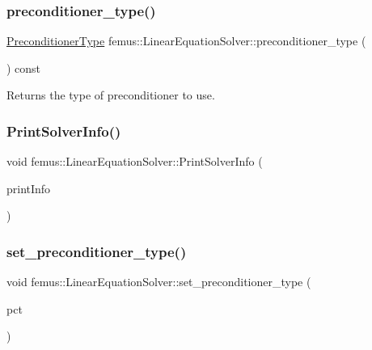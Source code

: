 \subsubsection{\texorpdfstring{preconditioner\+\_\+type()}{preconditioner\_type()}}
{\footnotesize\ttfamily \mbox{\hyperlink{_precondtype_enum_8hpp_a8b341faac6531c4543c9dc6e5e4592cf}{Preconditioner\+Type}} femus\+::\+Linear\+Equation\+Solver\+::preconditioner\+\_\+type (\begin{DoxyParamCaption}{ }\end{DoxyParamCaption}) const}

Returns the type of preconditioner to use. \mbox{\label{classfemus_1_1_linear_equation_solver_ae53651484ffebc06e7a95e5a5b0d82d7}} 
\subsubsection{\texorpdfstring{Print\+Solver\+Info()}{PrintSolverInfo()}}
{\footnotesize\ttfamily void femus\+::\+Linear\+Equation\+Solver\+::\+Print\+Solver\+Info (\begin{DoxyParamCaption}\item[{const bool \&}]{print\+Info }\end{DoxyParamCaption})\hspace{0.3cm}{\ttfamily [inline]}}

\mbox{\label{classfemus_1_1_linear_equation_solver_a43f59d053804f858ca075c8f5e39834c}} 
\subsubsection{\texorpdfstring{set\+\_\+preconditioner\+\_\+type()}{set\_preconditioner\_type()}}
{\footnotesize\ttfamily void femus\+::\+Linear\+Equation\+Solver\+::set\+\_\+preconditioner\+\_\+type (\begin{DoxyParamCaption}\item[{const \mbox{\hyperlink{_precondtype_enum_8hpp_a8b341faac6531c4543c9dc6e5e4592cf}{Preconditioner\+Type}}}]{pct }\end{DoxyParamCaption})}

